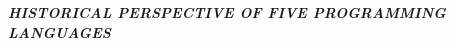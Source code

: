 \documentclass{article}
\begin{document}
	\textbf{\textit{HISTORICAL PERSPECTIVE OF FIVE PROGRAMMING LANGUAGES}}
\end{document}

